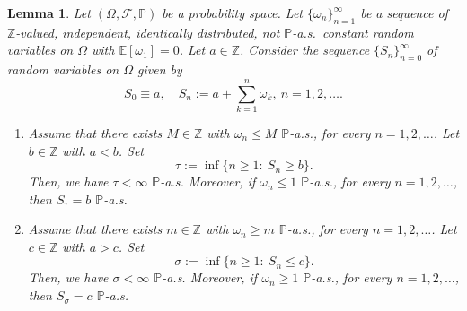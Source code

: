 \documentclass[10pt,a4paper]{amsart}
\newtheorem{lem}{Lemma}
\newcommand{\Z}{\mathbb{Z}}
\newcommand{\cF}{\mathcal{F}}
\begin{document}
\begin{lem}
\label{lem:finiteness_hitting_times}
Let $(\Omega,\cF,\mathbb{P})$ be a probability space. Let $\{\omega_n\}^{\infty}_{n=1}$ be a sequence of $\Z$-valued, independent, identically distributed, not $\mathbb{P}$-a.s.~constant random variables on $\Omega$ with $\mathbb{E}[\omega_1]=0$. Let $a\in\Z$. Consider the sequence $\{S_n\}_{n=0}^{\infty}$ of random variables on $\Omega$ given by
\begin{equation*}
	S_0\equiv a,\quad S_n:=a+\sum_{k=1}^{n}\omega_k,~n=1,2,\ldots.
\end{equation*}

\begin{enumerate}
    \item Assume that there exists $M\in\Z$ with $\omega_n\leq M$ $\mathbb{P}$-a.s., for every $n=1,2,\ldots$. Let $b\in\Z$ with $a<b$. Set
    \begin{equation*}
	    \tau:=\inf\{n\geq1:~S_n\geq b\}.
    \end{equation*}
    Then, we have $\tau<\infty$ $\mathbb{P}$-a.s. Moreover, if $\omega_n\leq 1$ $\mathbb{P}$-a.s., for every $n=1,2,\ldots$, then $S_{\tau}=b$ $\mathbb{P}$-a.s.

    \item Assume that there exists $m\in\Z$ with $\omega_n\geq m$ $\mathbb{P}$-a.s., for every $n=1,2,\ldots$. Let $c\in\Z$ with $a>c$. Set
    \begin{equation*}
	    \sigma:=\inf\{n\geq1:~S_n\leq c\}.
    \end{equation*}
    Then, we have $\sigma<\infty$ $\mathbb{P}$-a.s. Moreover, if $\omega_n\geq 1$ $\mathbb{P}$-a.s., for every $n=1,2,\ldots$, then $S_{\sigma}=c$ $\mathbb{P}$-a.s.
\end{enumerate}
\end{lem}
\end{document}
